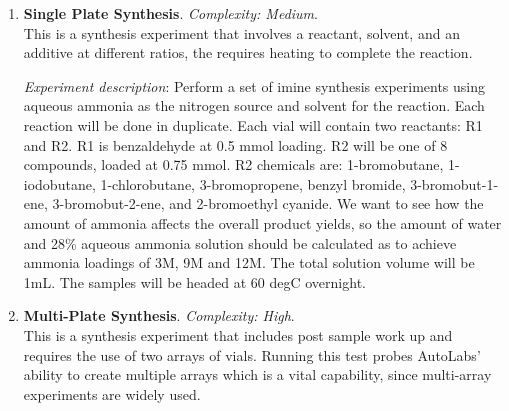 \documentclass[sn-nature, twocolumn]{sn-jnl}%
\theoremstyle{thmstyleone}%
\theoremstyle{thmstyletwo}%
\theoremstyle{thmstylethree}%
\begin{document}
\begin{enumerate}
    \textit{Experiment description}: Prepare a set of electrolyte solutions, each consisting of a salt, solvent, and modifier.  I have three salts: lithium perchlorate, lithium tetrafluoroborate and lithium hexafluorophosphate.  I want to prepare 6 compositions with salt 1 and 2, loading the vials at 20 mg each, and 12 compositions with salt 3, loading half the vials with 20 mg and half with 50 mg.  The solvent is propylene carbonate and the modifier is ethylene carbonate, which will be dispensed as a solution of 1\% ethylene carbonate in propylene carbonate.  For each salt loading I want 500 uL to be the final volume, and the modifier concentration should be varied from 0\%, 0.2\%, 0.4\%, 0.6\%, 0.8\%, and 1.0\%.  After preparing these solutions, they should be heated to 40 deg for 30 minutes with stirring to ensure homogeneity.\\

    \item \textbf{Single Plate Synthesis}.  \textit{Complexity: Medium}. \\
    This is a synthesis experiment that involves a reactant, solvent, and an additive at different ratios, the requires heating to complete the reaction.

    \textit{Experiment description}: Perform a set of imine synthesis experiments using aqueous ammonia as the nitrogen source and solvent for the reaction.  Each reaction will be done in duplicate.  Each vial will contain two reactants: R1 and R2.  R1 is benzaldehyde at 0.5 mmol loading.  R2 will be one of 8 compounds, loaded at 0.75 mmol.  R2 chemicals are:  1-bromobutane, 1-iodobutane, 1-chlorobutane, 3-bromopropene, benzyl bromide, 3-bromobut-1-ene, 3-bromobut-2-ene, and 2-bromoethyl cyanide.  We want to see how the amount of ammonia affects the overall product yields, so the amount of water and 28\% aqueous ammonia solution should be calculated as to achieve ammonia loadings of 3M, 9M and 12M.  The total solution volume will be 1mL.  The samples will be headed at 60 degC overnight.\\ 
    
    \item \textbf{Multi-Plate Synthesis}. \textit{Complexity: High}.\\
    This is a synthesis experiment that includes post sample work up and requires the use of two arrays of vials. Running this test probes AutoLabs' ability to create multiple arrays which is a vital capability, since multi-array experiments are widely used.


\end{enumerate}
\end{document}
